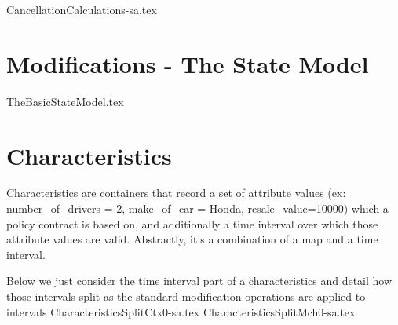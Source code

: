 {CancellationCalculations-sa.tex}

\section{Modifications - The State Model}
\label{sec:03:5}
{TheBasicStateModel.tex}

\section{Characteristics}
\label{sec:03:6}

Characteristics are containers that record a set of attribute values
(ex: number\_of\_drivers = 2, make\_of\_car = Honda, resale\_value=10000)
which a policy contract is based on, and additionally a time interval over which
those attribute values are valid. Abstractly, it's a combination of a map and a time
interval. 

Below we just consider the time interval part of a characteristics and detail
how those intervals split as the standard modification operations are applied
to intervals
{CharacteristicsSplitCtx0-sa.tex}
{CharacteristicsSplitMch0-sa.tex}
